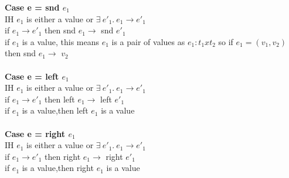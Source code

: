 \documentclass{article}
\begin{document}
\textbf{Case e = snd $e_1$} \\
IH $e_1$ is either a value or $  \exists \ e'_1.\ e_1 \to e'_1 $ \\
if $e_1 \to e'_1$ then snd $e_1 \to$ snd $e'_1$\\
if $e_1$ is a value, this means $e_1$ is a pair of values as $e_1: t_1 x t_2$
 so if $e_1 = (v_1, v_2)$ then snd $e_1 \to$ $v_2$\\ \\
\textbf{Case e = left $e_1$} \\
IH $e_1$ is either a value or $  \exists \ e'_1.\ e_1 \to e'_1 $ \\
if $e_1 \to e'_1$ then left $e_1 \to$ left $e'_1$\\
if $e_1$ is a value,then left $e_1$ is a value\\ \\
\textbf{Case e = right $e_1$} \\
IH $e_1$ is either a value or $  \exists \ e'_1.\ e_1 \to e'_1 $ \\
if $e_1 \to e'_1$ then right $e_1 \to$ right $e'_1$\\
if $e_1$ is a value,then right $e_1$ is a value\\ \\
\end{document}
